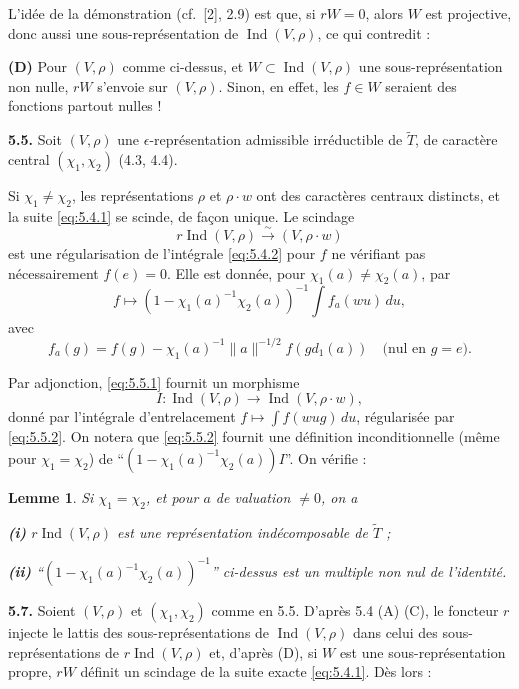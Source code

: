 \documentclass[12pt,a4paper]{article}
\theoremstyle{plain}
\newtheorem{lemma}[theorem]{Lemme}
\theoremstyle{definition}
\theoremstyle{remark}
\DeclareMathOperator{\Ind}{Ind}
\newcommand{\wt}{\widetilde}
\begin{document}
L'idée de la démonstration (cf.\ [2], 2.9) est que, si $rW = 0$, alors $W$ est projective, donc aussi une sous-représentation de $\Ind(V, \rho)$, ce qui contredit :

\textbf{(D)} Pour $(V, \rho)$ comme ci-dessus, et $W \subset \Ind(V, \rho)$ une sous-représentation non nulle, $rW$ s'envoie sur $(V, \rho)$. Sinon, en effet, les $f \in W$ seraient des fonctions partout nulles !

\textbf{5.5.} Soit $(V, \rho)$ une $\epsilon$-représentation admissible irréductible de $\wt{T}$, de caractère central $(\chi_1, \chi_2)$ (4.3, 4.4).

Si $\chi_1 \neq \chi_2$, les représentations $\rho$ et $\rho \cdot w$ ont des caractères centraux distincts, et la suite \eqref{eq:5.4.1} se scinde, de façon unique. Le scindage
\begin{equation}\label{eq:5.5.1}
r \Ind(V, \rho) \xrightarrow{\sim} (V, \rho \cdot w)
\tag{5.5.1}
\end{equation}
est une régularisation de l'intégrale \eqref{eq:5.4.2} pour $f$ ne vérifiant pas nécessairement $f(e) = 0$. Elle est donnée, pour $\chi_1(a) \neq \chi_2(a)$, par
\begin{equation}\label{eq:5.5.2}
f \longmapsto (1 - \chi_1(a)^{-1} \chi_2(a))^{-1} \int f_a(wu) \, du,
\tag{5.5.2}
\end{equation}
avec
\[
f_a(g) = f(g) - \chi_1(a)^{-1} \|a\|^{-1/2} f(g d_1(a)) \quad \text{(nul en } g = e\text{).}
\]

Par adjonction, \eqref{eq:5.5.1} fournit un morphisme
\begin{equation}\label{eq:5.5.3}
I : \Ind(V, \rho) \longrightarrow \Ind(V, \rho \cdot w),
\tag{5.5.3}
\end{equation}
donné par l'intégrale d'entrelacement $f \mapsto \int f(wug) \, du$, régularisée par \eqref{eq:5.5.2}. On notera que \eqref{eq:5.5.2} fournit une définition inconditionnelle (même pour $\chi_1 = \chi_2$) de ``$(1 - \chi_1(a)^{-1} \chi_2(a)) I$''. On vérifie :

\begin{lemma}\label{lem:5.6}
Si $\chi_1 = \chi_2$, et pour $a$ de valuation $\neq 0$, on a

\textbf{(i)} $r \Ind(V, \rho)$ est une représentation indécomposable de $\wt{T}$ ;

\textbf{(ii)} ``$(1 - \chi_1(a)^{-1} \chi_2(a))^{-1}$'' ci-dessus est un multiple non nul de l'identité.
\end{lemma}

\textbf{5.7.} Soient $(V, \rho)$ et $(\chi_1, \chi_2)$ comme en 5.5. D'après 5.4 (A) (C), le foncteur $r$ injecte le lattis des sous-représentations de $\Ind(V, \rho)$ dans celui des sous-représentations de $r \Ind(V, \rho)$ et, d'après (D), si $W$ est une sous-représentation propre, $rW$ définit un scindage de la suite exacte \eqref{eq:5.4.1}. Dès lors :
\end{document}
